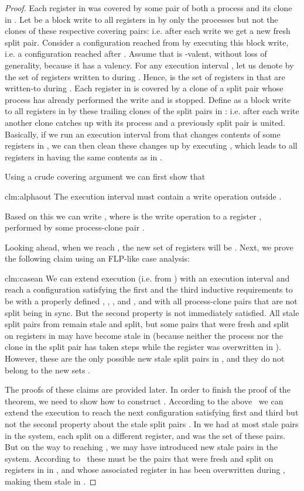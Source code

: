 \begin{proof}
Each register in  was covered by some pair of both a process and its clone in .
Let  be a block write to all registers in  by only the processes but not the clones 
  of these respective covering pairs: i.e. after each write we get a new fresh split pair.
Consider a configuration  reached from  by executing this block write, i.e. a configuration reached after .
Assume that  is -valent, without loss of generality, because it has a valency.
For any execution interval , let us denote by  the set of registers written to during .
Hence,  is the set of registers in  that are written-to during .
Each register in  is covered by a clone of a split pair whose process has already performed the write and is stopped.
Define  as a block write to all registers in  by these trailing clones of the split pairs in : 
  i.e. after each write another clone catches up with its process and a previously split pair is united.
Basically, if we run an execution interval  from  that changes contents of some registers in ,
  we can then clean these changes up by executing , 
  which leads to all registers in  having the same contents as in .

Using a crude covering argument we can first show that
\begin{repclaim}{clm:alphaout}
The execution interval  must contain a write operation outside .
\end{repclaim}
\noindent Based on this we can write , 
  where  is the write operation to a register , performed by some process-clone pair .
    
Looking ahead, when we reach , the new set of registers  will be .
Next, we prove the following claim using an FLP-like case analysis:
\begin{repclaim}{clm:casean}
We can extend execution  (i.e. from ) with an execution interval  and reach a configuration 
  satisfying the first and the third inductive requirements to be  
  with a properly defined , , ,  and ,
  and with all process-clone pairs that are not split being in sync.
But the second property is not immediately satisfied.
All stale split pairs from  remain stale and split, but some pairs that were fresh and split on registers 
  in  may have become stale in  
  (because neither the process nor the clone in the split pair has taken steps while the register was overwritten in ). 
However, these are the only possible new stale split pairs in , and they do not belong to the new sets .
\end{repclaim}
The proofs of these claims are provided later. 
In order to finish the proof of the theorem, we need to show how to construct .
According to the above~ we can extend the execution to reach the next configuration  
  satisfying first and third but not the second property about the stale split pairs .
In  we had at most  stale pairs in the system, each split on a different register, and  was the set of these pairs.
But on the way to reaching , we may have introduced new stale pairs in the system.
According to~ these must be the pairs that were fresh and split on registers in  in ,
  and whose associated register in  has been overwritten during , making them stale in .


\end{proof}

